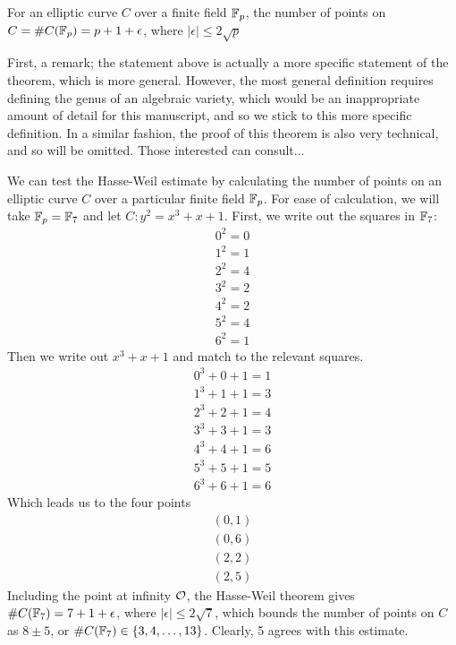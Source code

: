 
\begin{theorem}
For an elliptic curve $C$ over a finite field $\fp$, the number of points on $C = \#C(\fp) = p + 1 + \epsilon$, where $|\epsilon| \leq 2\sqrt{p}$
\end{theorem}
\begin{sproof}
	First, a remark; the statement above is actually a more specific statement of the theorem, which is more general. However, the most general definition requires defining the genus of an algebraic variety, which would be an inappropriate amount of detail for this manuscript, and so we stick to this more specific definition.
	In a similar fashion, the proof of this theorem is also very technical, and so will be omitted. Those interested can consult...
\end{sproof}
We can test the Hasse-Weil estimate by calculating the number of points on an elliptic curve $C$ over a particular finite field $\fp$. For ease of calculation, we will take $\fp = \fp[7]$ and let $C : y^2 = x^3 + x + 1$. First, we write out the squares in $\fp[7]$:
\begin{align*}
0^2 = 0\\
1^2 = 1\\
2^2 = 4\\
3^2 = 2\\
4^2 = 2\\
5^2 = 4\\
6^2 = 1
\end{align*}
Then we write out $x^3+x+1$ and match to the relevant squares.
\begin{align*}
0^3 + 0 + 1 = 1\\
1^3 + 1 + 1 = 3\\
2^3 + 2 + 1 = 4\\
3^3 + 3 + 1 = 3\\
4^3 + 4 + 1 = 6\\
5^3 + 5 + 1 = 5\\
6^3 + 6 + 1 = 6
\end{align*}
Which leads us to the four points
\begin{align*}
(0,1)\\
(0,6)\\
(2,2)\\
(2,5)
\end{align*}
Including the point at infinity $\pai$, the Hasse-Weil theorem gives $\#C(\fp[7]) = 7 + 1 + \epsilon$, where $|\epsilon| \leq 2\sqrt{7}$, which bounds the number of points on $C$ as $8\pm5$, or $\#C(\fp[7]) \in \{3,4,\ldots,13\}$. Clearly, 5 %
agrees with this estimate.
